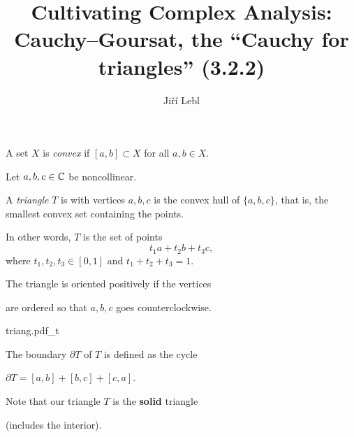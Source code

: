 \documentclass[10pt,aspectratio=169]{beamer}
\author{Ji\v{r}\'i Lebl}
\institute[OSU]{%
Departemento pri Matematiko de Oklahoma {\^S}tata Universitato}
\title{Cultivating Complex Analysis:\\%
Cauchy--Goursat, the ``Cauchy for triangles'' (3.2.2)}
\date{}
\begin{document}
\begin{frame}
\titlepage
\end{frame}

\begin{frame}
A set $X$ is \emph{convex} 
if $[a,b] \subset X$ for all $a,b \in X$.

\medskip
\pause

Let $a,b,c \in {\mathbb{C}}$ be noncollinear.

\medskip
\pause

A \emph{triangle} $T$ is with vertices $a,b,c$
is the convex hull of $\{ a,b,c \}$, that is,
the smallest convex set containing the points.

\medskip
\pause

In other words, $T$ is the set of points
\begin{equation*}
t_1 a + t_2 b + t_3 c ,
\end{equation*}
where $t_1,t_2,t_3 \in [0,1]$ and $t_1+t_2+t_3 = 1$.

\medskip
\pause

The triangle is oriented positively if the vertices 

are ordered so that $a,b,c$ goes counterclockwise.

\vspace*{-0.4in}
\hspace*{3.1in}%
{triang.pdf_t}

\vspace*{-0.4in}
\pause

The boundary $\partial T$ of $T$ is defined as the cycle

\medskip

$\partial T = [a,b] + [b,c] + [c,a]$.

\medskip
\pause

Note that our triangle $T$ is the \textbf{solid} triangle

(includes the interior).

\end{frame}
\end{document}
